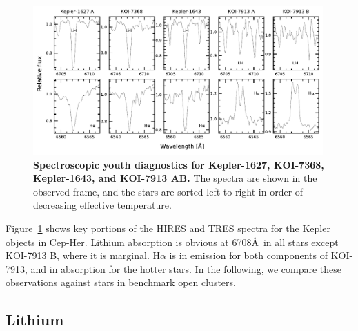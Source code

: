 \documentclass[12pt,twocolumn]{aastex63}
\begin{document}
\begin{figure}[b]
	\begin{center}
		\leavevmode
			\includegraphics[width=0.99\textwidth]{f5.pdf}
	\end{center}
	\vspace{-0.3cm}
	\caption{
    {\bf Spectroscopic youth diagnostics for Kepler-1627, KOI-7368,
    Kepler-1643, and KOI-7913 AB. }
    The spectra are shown in the observed frame, and the stars are
    sorted left-to-right in order of decreasing effective temperature.
    \label{fig:koiyouthindicators}
	}
\end{figure}

Figure~\ref{fig:koiyouthindicators} shows key portions of the HIRES
and TRES spectra for the Kepler objects in Cep-Her.  Lithium
absorption is obvious at 6708\AA\ in all stars except KOI-7913 B,
where it is marginal.  H$\alpha$ is in emission for both components of
KOI-7913, and in absorption for the hotter stars.  In the following,
we compare these observations against stars in benchmark open
clusters.

\subsection{Lithium}
\end{document}
